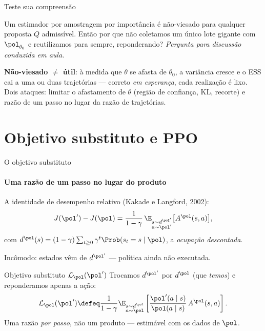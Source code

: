 \documentclass[aspectratio=169, 10pt]{beamer}
\newcommand{\paradiscussao}{\smallskip
  {\footnotesize\color{rlCinza}\itshape Pergunta para discussão conduzida em aula.}}
\newcommand{\thv}{\theta}
\newcommand{\polnovo}{\pol'}
\newcommand{\Advpi}{A^{\pol}}
\newcommand{\dpi}{d^{\pol}}
\newcommand{\Lsub}[1]{\mathcal{L}_{#1}}
\begin{document}
\begin{frame}{Teste sua compreensão}

  \begin{quizbox}{}
    Um estimador por amostragem por importância é não-viesado para qualquer
    proposta $Q$ admissível. Então por que não coletamos um único lote gigante com
    $\pol_{\thv_0}$ e reutilizamos para sempre, reponderando?
    \paradiscussao
  \end{quizbox}

  \pause

  \begin{respbox}
    \textbf{Não-viesado $\neq$ útil}: à medida que $\thv$ se afasta de $\thv_0$, a
    variância cresce e o ESS cai a uma ou duas trajetórias --- correto \emph{em
    esperança}, cada realização é lixo. Dois ataques: \alert{limitar o afastamento
    de $\thv$} (região de confiança, KL, recorte) e \alert{razão de um passo} no
    lugar da razão de trajetórias.
  \end{respbox}
\end{frame}

\section{Objetivo substituto e PPO}

\begin{frame}{O objetivo substituto}
  \framesubtitle{Uma razão de um passo no lugar do produto}

  A identidade de desempenho relativo (Kakade e Langford, 2002):
  \[
    J(\polnovo) - J(\pol) = \frac{1}{1-\gamma}\,
      \E_{\substack{s\sim d^{\polnovo}\\ a\sim\polnovo}}\bigl[\Advpi(s,a)\bigr],
  \]
  com $d^{\pol}(s) = (1-\gamma)\sum_{t\ge0}\gamma^t \Prob(s_t = s\mid \pol)$, a \emph{ocupação descontada}.

  \vspace{-0.3em}
  \begin{alertabox}
    Incômodo: estados vêm de $d^{\polnovo}$ --- política ainda não executada.
  \end{alertabox}

  \pause
  \vspace{-0.3em}
  \begin{defbox}{Objetivo substituto $\Lsub{\pol}(\polnovo)$}
    Trocamos $d^{\polnovo}$ por $\dpi$ (que \emph{temos}) e reponderamos apenas a ação:
    \[
      \Lsub{\pol}(\polnovo) \defeq \frac{1}{1-\gamma}
        \E_{\substack{s\sim \dpi\\ a\sim\pol}}
        \left[\frac{\polnovo(a\mid s)}{\pol(a\mid s)}\,\Advpi(s,a)\right].
    \]
    Uma razão \emph{por passo}, não um produto --- estimável com os dados de $\pol$.
  \end{defbox}
\end{frame}
\end{document}
